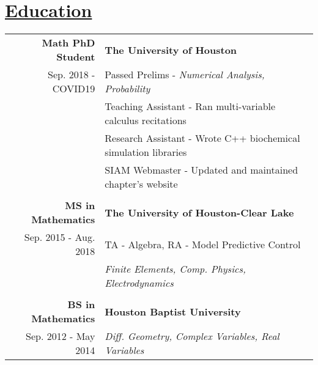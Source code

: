 \section*{\underline{Education}}

\begin{tabular}{ r | l }
\bf Math PhD Student        &\bf The University of Houston\\
Sep. 2018 - COVID19         &Passed Prelims - \textit{Numerical Analysis, Probability}\\
                            &Teaching Assistant - Ran multi-variable calculus recitations\\
                            &Research Assistant - Wrote C++ biochemical simulation libraries\\
                            &SIAM Webmaster - Updated and maintained chapter's website\\
\\
\bf MS in Mathematics       &\bf The University of Houston-Clear Lake\\
Sep. 2015 - Aug. 2018       &TA - Algebra, RA - Model Predictive Control\\
                            &\textit{Finite Elements, Comp. Physics, Electrodynamics}\\
\\
\bf BS in Mathematics       &\bf Houston Baptist University\\
Sep. 2012 - May 2014        &\textit{Diff. Geometry, Complex Variables, Real Variables}
\end{tabular}